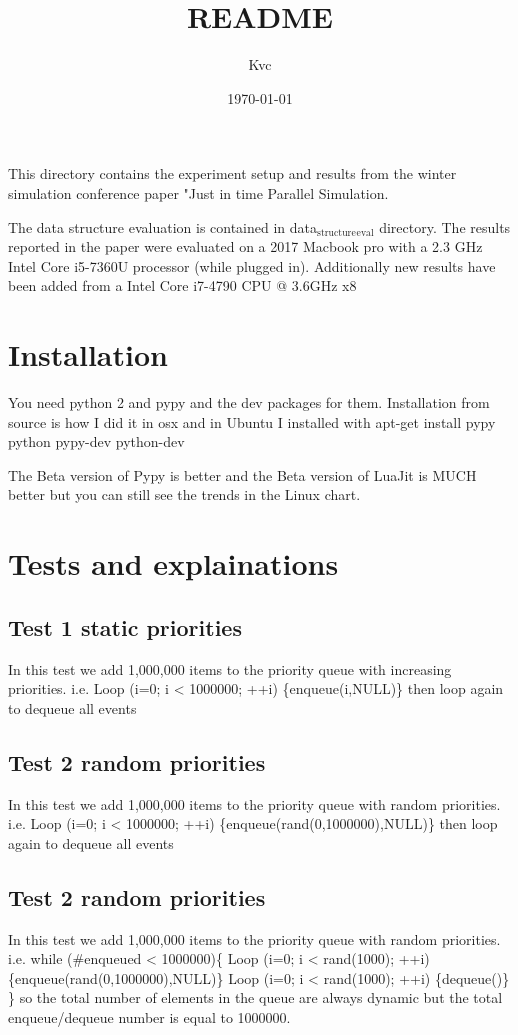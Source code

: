 \documentclass[11pt]{article}
\author{Kvc}
\date{\today}
\title{README}
\begin{document}
\maketitle
\tableofcontents

This directory contains the experiment setup and results from the 
winter simulation conference paper "Just in time Parallel Simulation.

The data structure evaluation is contained in data$_{\text{structure}}$$_{\text{eval}}$ directory. 
The results reported in the paper were evaluated on a 2017 Macbook pro 
with a 2.3 GHz Intel Core i5-7360U processor (while plugged in). 
Additionally new results have been added from a Intel Core i7-4790 CPU @ 3.6GHz x8

\section{Installation}
\label{sec-1}
You need python 2 and pypy and the dev packages for them.
Installation from source is how I did it in osx and in Ubuntu I installed with
apt-get install pypy python pypy-dev python-dev

The Beta version of Pypy is better and the
 Beta version of LuaJit is MUCH 
better but you can still see the trends in the Linux chart.


\section{Tests and explainations}
\label{sec-2}
\subsection{Test 1 static priorities}
\label{sec-2-1}
In this test we add 1,000,000 items to the priority queue with increasing priorities.
i.e. Loop (i=0; i < 1000000; ++i) \{enqueue(i,NULL)\}
then loop again to dequeue all events


\subsection{Test 2 random priorities}
\label{sec-2-2}
In this test we add 1,000,000 items to the priority queue with random priorities.
i.e. Loop (i=0; i < 1000000; ++i) \{enqueue(rand(0,1000000),NULL)\}
then loop again to dequeue all events



\subsection{Test 2 random priorities}
\label{sec-2-3}
In this test we add 1,000,000 items to the priority queue with random priorities.
i.e. 
while (\#enqueued < 1000000)\{
Loop (i=0; i < rand(1000); ++i) \{enqueue(rand(0,1000000),NULL)\}
Loop (i=0; i < rand(1000); ++i) \{dequeue()\}
\}
so the total number of elements in the queue are always dynamic 
but the total enqueue/dequeue number is equal to 1000000.
\end{document}
